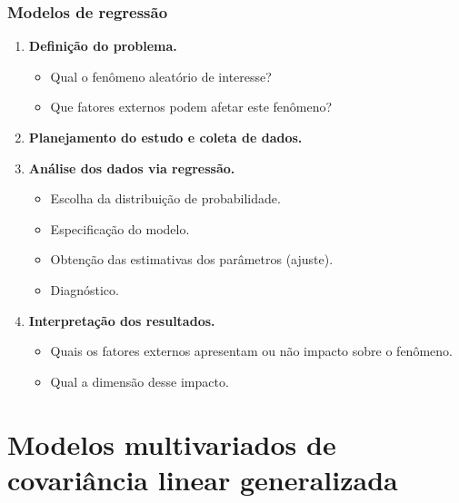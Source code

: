 \documentclass[10pt,
  aspectratio=169,
  serif,
  mathserif,
  professionalfont,
  compress,
  handout,
  ]{beamer}\usepackage[]{graphicx}\usepackage[]{color}
\begin{document}
\begin{frame}
  \frametitle{Modelos de regressão}

  \begin{enumerate}
    \itemsep 2ex
    
      \item \textbf{Definição do problema.}
      
      \begin{itemize}
        \item Qual o fenômeno aleatório de interesse?
        \item Que fatores externos podem afetar este fenômeno?
      \end{itemize}

      
      \item \textbf{Planejamento do estudo e coleta de dados.}
      
      \item \textbf{Análise dos dados via regressão.}
      
        \begin{itemize}
          \item Escolha da distribuição de probabilidade.
          \item Especificação do modelo.
          \item Obtenção das estimativas dos parâmetros (ajuste).
          \item Diagnóstico.
        \end{itemize}
      
      \item \textbf{Interpretação dos resultados.}
      
        \begin{itemize}
          \item Quais os fatores externos apresentam ou não impacto sobre o fenômeno.
          \item Qual a dimensão desse impacto.
        \end{itemize}      
  
  \end{enumerate}
\end{frame}

\section{Modelos multivariados de covariância linear generalizada}
\end{document}
